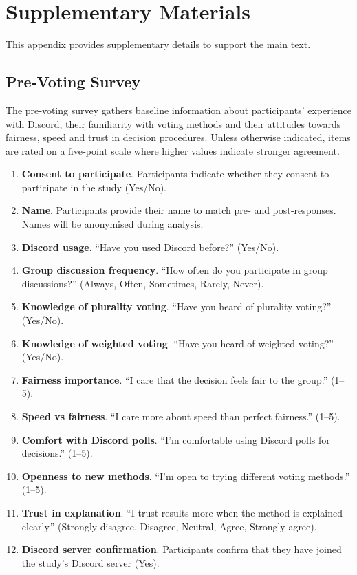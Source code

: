 \doublespacing %

\chapter{Supplementary Materials}
\label{appendix}

\thesisspacing %

This appendix provides supplementary details to support the main text.

\section{Pre‑Voting Survey}
\label{appendix:pre-survey}

The pre‑voting survey gathers baseline information about participants’
experience with Discord, their familiarity with voting methods and their
attitudes towards fairness, speed and trust in decision procedures.  Unless
otherwise indicated, items are rated on a five‑point scale where higher
values indicate stronger agreement.

\begin{enumerate}
    \item \textbf{Consent to participate}.  Participants indicate whether they
    consent to participate in the study (Yes/No).
    \item \textbf{Name}.  Participants provide their name to match pre‑ and
    post‑responses.  Names will be anonymised during analysis.
    \item \textbf{Discord usage}.  ``Have you used Discord before?'' (Yes/No).
    \item \textbf{Group discussion frequency}.  ``How often do you
    participate in group discussions?'' (Always, Often, Sometimes, Rarely,
    Never).
    \item \textbf{Knowledge of plurality voting}.  ``Have you heard of
    plurality voting?'' (Yes/No).
    \item \textbf{Knowledge of weighted voting}.  ``Have you heard of
    weighted voting?'' (Yes/No).
    \item \textbf{Fairness importance}.  ``I care that the decision feels
    fair to the group.'' (1–5).
    \item \textbf{Speed vs fairness}.  ``I care more about speed than
    perfect fairness.'' (1–5).
    \item \textbf{Comfort with Discord polls}.  ``I’m comfortable using
    Discord polls for decisions.'' (1–5).
    \item \textbf{Openness to new methods}.  ``I’m open to trying different
    voting methods.'' (1–5).
    \item \textbf{Trust in explanation}.  ``I trust results more when the
    method is explained clearly.'' (Strongly disagree, Disagree, Neutral,
    Agree, Strongly agree).
    \item \textbf{Discord server confirmation}.  Participants confirm that
    they have joined the study’s Discord server (Yes).
\end{enumerate}

